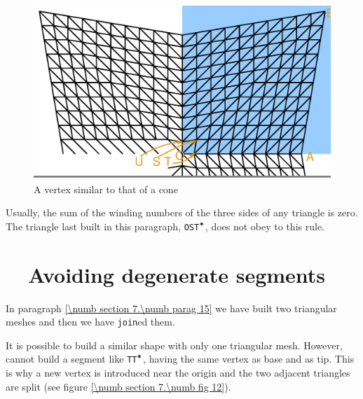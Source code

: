 \begin{figure}[ht] \centering
  \includegraphics[width=120mm]{butterfly.eps}
  \caption{A vertex similar to that of a cone}
  \label{\numb section 7.\numb fig 11}
\end{figure}

Usually, the sum of the winding numbers of the three sides of any triangle is zero.
The triangle last built in this paragraph, {\small\tt OST$^{\mbox{\small\tt *}}$},
does not obey to this rule.


\section{~~Avoiding degenerate segments}\label{\numb section 7.\numb parag 16}

In paragraph \ref{\numb section 7.\numb parag 15} we have built two triangular meshes
and then we have {\small\tt join}ed them.

It is possible to build a similar shape with only one triangular mesh.
However, {\maniFEM} cannot build a segment like {\small\tt TT$^{\mbox{\small\tt *}}$},
having the same vertex as base and as tip.
This is why a new vertex is introduced near the origin and the two adjacent triangles
are split (see figure \ref{\numb section 7.\numb fig 12}).

